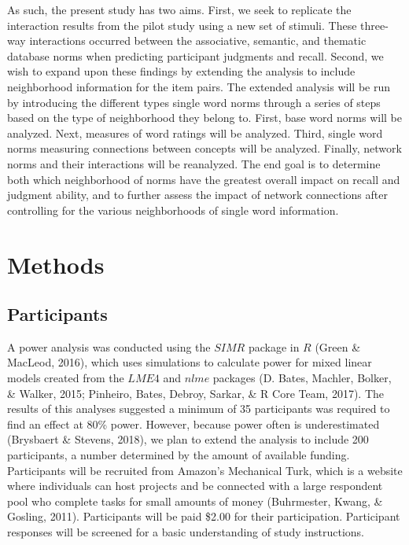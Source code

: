 \documentclass[english,man]{apa6}
\theoremstyle{definition}
\theoremstyle{definition}
\theoremstyle{remark}
\begin{document}
As such, the present study has two aims. First, we seek to replicate the
interaction results from the pilot study using a new set of stimuli.
These three-way interactions occurred between the associative, semantic,
and thematic database norms when predicting participant judgments and
recall. Second, we wish to expand upon these findings by extending the
analysis to include neighborhood information for the item pairs. The
extended analysis will be run by introducing the different types single
word norms through a series of steps based on the type of neighborhood
they belong to. First, base word norms will be analyzed. Next, measures
of word ratings will be analyzed. Third, single word norms measuring
connections between concepts will be analyzed. Finally, network norms
and their interactions will be reanalyzed. The end goal is to determine
both which neighborhood of norms have the greatest overall impact on
recall and judgment ability, and to further assess the impact of network
connections after controlling for the various neighborhoods of single
word information.

\section{Methods}\label{methods}

\subsection{Participants}\label{participants}

A power analysis was conducted using the \(SIMR\) package in \(R\)
(Green \& MacLeod, 2016), which uses simulations to calculate power for
mixed linear models created from the \(LME4\) and \(nlme\) packages (D.
Bates, Machler, Bolker, \& Walker, 2015; Pinheiro, Bates, Debroy,
Sarkar, \& R Core Team, 2017). The results of this analyses suggested a
minimum of 35 participants was required to find an effect at 80\% power.
However, because power often is underestimated (Brysbaert \& Stevens,
2018), we plan to extend the analysis to include 200 participants, a
number determined by the amount of available funding. Participants will
be recruited from Amazon's Mechanical Turk, which is a website where
individuals can host projects and be connected with a large respondent
pool who complete tasks for small amounts of money (Buhrmester, Kwang,
\& Gosling, 2011). Participants will be paid \$2.00 for their
participation. Participant responses will be screened for a basic
understanding of study instructions.
\end{document}

